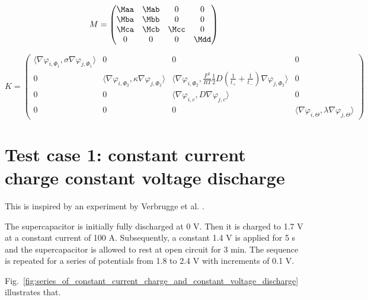 \documentclass[10pt, oneside]{article}   	%
\begin{document}
\begin{equation}
    M =
    \begin{pmatrix}
        \Maa & \Mab & 0    & 0    \\
        \Mba & \Mbb & 0    & 0    \\
        \Mca & \Mcb & \Mcc & 0    \\
        0    & 0    & 0    & \Mdd \\
    \end{pmatrix}
\end{equation}


\newcommand{\Kaa}{\langle \nabla\varphi_{i,\Phi_1}, \sigma \nabla\varphi_{j,\Phi_1} \rangle}
\newcommand{\Kbb}{\langle \nabla\varphi_{i,\Phi_2}, \kappa \nabla\varphi_{j,\Phi_2} \rangle}
\newcommand{\Kbc}{\langle \nabla\varphi_{i,\Phi_2}, \frac{F^2}{RT}\frac12D\left(\frac{1}{t_+}+\frac{1}{t_-}\right) \nabla\varphi_{j,\Phi_2} \rangle}
\newcommand{\Kcc}{\langle \nabla\varphi_{i,c}, D \nabla\varphi_{j,c} \rangle}
\newcommand{\Kdd}{\langle \nabla\varphi_{i,\Theta}, \lambda \nabla\varphi_{j,\Theta} \rangle}
\begin{equation}
    K =
    \begin{pmatrix}
        \Kaa  & 0    & 0    & 0 \\
        0     & \Kbb & \Kbc & 0 \\
        0     & 0    & \Kcc & 0 \\
        0     & 0    & 0    & \Kdd
    \end{pmatrix}
\end{equation}

\newpage
\section{Test case 1: constant current charge constant voltage discharge}
This is inspired by an experiment by Verbrugge et al. \cite{Verbrugge2005}.

The supercapacitor is initially fully discharged at 0 V.  Then it is charged
to 1.7 V at a constant current of 100 A.  Subsequently, a constant 1.4 V is
applied for 5 s and the supercapacitor is allowed to rest at open circuit for
3 min.  The sequence is repeated for a series of potentials from 1.8 to 2.4 V
with increments of 0.1 V.

Fig.~\ref{fig:series_of_constant_current_charge_and_constant_voltage_discharge}
illustrates that.
\end{document}
